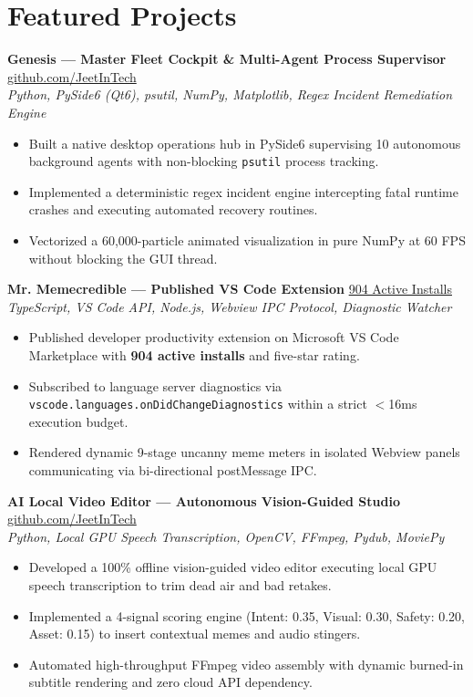 \documentclass[10pt]{article}
\begin{document}
\section*{Featured Projects}
\textbf{Genesis — Master Fleet Cockpit \& Multi-Agent Process Supervisor} \hfill \href{https://github.com/JeetInTech}{github.com/JeetInTech} \\
\textit{Python, PySide6 (Qt6), psutil, NumPy, Matplotlib, Regex Incident Remediation Engine}
\begin{itemize}
    \item Built a native desktop operations hub in PySide6 supervising 10 autonomous background agents with non-blocking \texttt{psutil} process tracking.
    \item Implemented a deterministic regex incident engine intercepting fatal runtime crashes and executing automated recovery routines.
    \item Vectorized a 60,000-particle animated visualization in pure NumPy at 60 FPS without blocking the GUI thread.
\end{itemize}

\vspace{1.5pt}
\textbf{Mr. Memecredible — Published VS Code Extension} \hfill \href{https://marketplace.visualstudio.com/items?itemName=SangramjeetGhosh.mr-memecredible}{904 Active Installs} \\
\textit{TypeScript, VS Code API, Node.js, Webview IPC Protocol, Diagnostic Watcher}
\begin{itemize}
    \item Published developer productivity extension on Microsoft VS Code Marketplace with \textbf{904 active installs} and five-star rating.
    \item Subscribed to language server diagnostics via \texttt{vscode.languages.onDidChangeDiagnostics} within a strict $<$16ms execution budget.
    \item Rendered dynamic 9-stage uncanny meme meters in isolated Webview panels communicating via bi-directional postMessage IPC.
\end{itemize}

\vspace{1.5pt}
\textbf{AI Local Video Editor — Autonomous Vision-Guided Studio} \hfill \href{https://github.com/JeetInTech}{github.com/JeetInTech} \\
\textit{Python, Local GPU Speech Transcription, OpenCV, FFmpeg, Pydub, MoviePy}
\begin{itemize}
    \item Developed a 100\% offline vision-guided video editor executing local GPU speech transcription to trim dead air and bad retakes.
    \item Implemented a 4-signal scoring engine (Intent: 0.35, Visual: 0.30, Safety: 0.20, Asset: 0.15) to insert contextual memes and audio stingers.
    \item Automated high-throughput FFmpeg video assembly with dynamic burned-in subtitle rendering and zero cloud API dependency.
\end{itemize}
\end{document}
